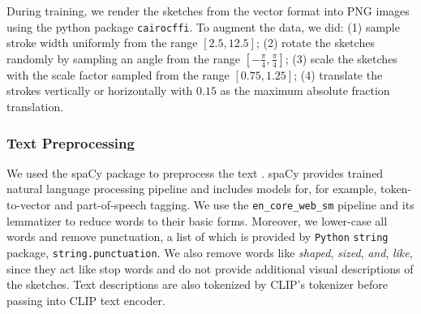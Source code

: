 During training, we render the sketches from the vector format into PNG images using the python package \texttt{cairocffi}. To augment the data, we did: (1) sample stroke width uniformly from the range $[2.5,12.5]$; (2) rotate the sketches randomly by sampling an angle from the range $[-\frac{\pi}{4}, \frac{\pi}{4}]$; (3) scale the sketches with the scale factor sampled from the range $[0.75, 1.25]$; (4) translate the strokes vertically or horizontally with $0.15$ as the maximum absolute fraction translation.   

\subsubsection*{Text Preprocessing} \label{text.preprocess}
We used the spaCy package to preprocess the text \citep{spacy2}. spaCy provides trained natural language processing pipeline and includes models for, for example, token-to-vector and part-of-speech tagging. We use the \texttt{en\_core\_web\_sm} pipeline and its lemmatizer to reduce words to their basic forms. Moreover, we lower-case all words and remove punctuation, a list of which is provided by \texttt{Python} \texttt{string} package, \texttt{string.punctuation}. We also remove words like \textit{shaped}, \textit{sized}, \textit{and}, \textit{like}, since they act like stop words and do not provide additional visual descriptions of the sketches. Text descriptions are also tokenized by CLIP's tokenizer before passing into CLIP text encoder.     

